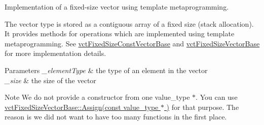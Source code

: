 Implementation of a fixed-\/size vector using template metaprogramming. 

The vector type is stored as a contiguous array of a fixed size (stack allocation). It provides methods for operations which are implemented using template metaprogramming. See \hyperlink{classvct_fixed_size_const_vector_base}{vct\-Fixed\-Size\-Const\-Vector\-Base} and \hyperlink{classvct_fixed_size_vector_base}{vct\-Fixed\-Size\-Vector\-Base} for more implementation details.


\begin{DoxyParams}{Parameters}
{\em \-\_\-element\-Type} & the type of an element in the vector \\
\hline
{\em \-\_\-size} & the size of the vector\\
\hline
\end{DoxyParams}
\begin{DoxyNote}{Note}
We do not provide a constructor from one {\ttfamily value\-\_\-type $\ast$}. You can use \hyperlink{classvct_fixed_size_vector_base_a38d50afd2b6bc08c82a9aac3ecba8a3d}{vct\-Fixed\-Size\-Vector\-Base\-::\-Assign(const value\-\_\-type $\ast$ )} for that purpose. The reason is we did not want to have too many functions in the first place. 
\end{DoxyNote}


